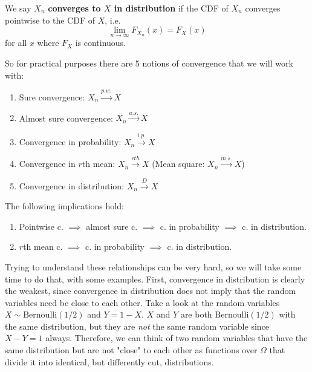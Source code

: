   \begin{definition}
    We say $X_n$ \textbf{converges to $X$ in distribution} if the CDF of $X_n$ converges pointwise to the CDF of $X$, i.e. 
    \begin{equation}
      \lim_{n \rightarrow \infty} F_{X_n} (x) = F_X (x)
    \end{equation}
    for all $x$ where $F_{X}$ is continuous. 
  \end{definition}

  So for practical purposes there are 5 notions of convergence that we will work with: 
  \begin{enumerate}
      \item Sure convergence: $X_n \xrightarrow{p.w.} X$ 
      \item Almost sure convergence: $X_n \xrightarrow{a.s.} X$ 
      \item Convergence in probability: $X_n \xrightarrow{i.p.} X$ 
      \item Convergence in $r$th mean: $X_n \xrightarrow{rth} X$ (Mean square: $X_n \xrightarrow{m.s.} X$) 
      \item Convergence in distribution: $X_n \xrightarrow{D} X$
  \end{enumerate}

  \begin{theorem}
    The following implications hold: 
    \begin{enumerate}
      \item Pointwise c. $\implies$ almost sure c. $\implies$ c. in probability $\implies$ c. in distribution. 
      \item $r$th mean c. $\implies$ c. in probability $\implies$ c. in distribution. 
    \end{enumerate}
  \end{theorem}

  Trying to understand these relationships can be very hard, so we will take some time to do that, with some examples. First, convergence in distribution is clearly the weakest, since convergence in distribution does not imply that the random variables need be close to each other. Take a look at the random variables $X \sim \mathrm{Bernoulli}(1/2)$ and $Y = 1 - X$. $X$ and $Y$ are both $\mathrm{Bernoulli}(1/2)$ with the same distribution, but they are \textit{not} the same random variable since $X - Y = 1$ always. Therefore, we can think of two random variables that have the same distribution but are not "close" to each other as functions over $\Omega$ that divide it into identical, but differently cut, distributions. 

